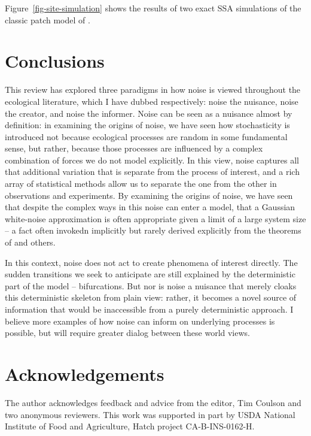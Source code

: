 \documentclass[
  authoryear,
  preprint,
  3p]{elsarticle}
\begin{document}
Figure~\ref{fig-site-simulation} shows the results of two exact SSA
simulations of the classic patch model of \citet{Levins1969}.

\section{Conclusions}\label{conclusions}

This review has explored three paradigms in how noise is viewed
throughout the ecological literature, which I have dubbed respectively:
noise the nuisance, noise the creator, and noise the informer. Noise can
be seen as a nuisance almost by definition: in examining the origins of
noise, we have seen how stochasticity is introduced not because
ecological processes are random in some fundamental sense, but rather,
because those processes are influenced by a complex combination of
forces we do not model explicitly. In this view, noise captures all that
additional variation that is separate from the process of interest, and
a rich array of statistical methods allow us to separate the one from
the other in observations and experiments. By examining the origins of
noise, we have seen that despite the complex ways in this noise can
enter a model, that a Gaussian white-noise approximation
\citep{vanKampen2007, Black2012} is often appropriate given a limit of a
large system size -- a fact often invokedn implicitly but rarely derived
explicitly from the theorems of \citet{Kurtz1978} and others.

In this context, noise does not act to create phenomena of interest
directly. The sudden transitions we seek to anticipate are still
explained by the deterministic part of the model -- bifurcations. But
nor is noise a nuisance that merely cloaks this deterministic skeleton
from plain view: rather, it becomes a novel source of information that
would be inaccessible from a purely deterministic approach. I believe
more examples of how noise can inform on underlying processes is
possible, but will require greater dialog between these world views.

\section{Acknowledgements}\label{acknowledgements}

The author acknowledges feedback and advice from the editor, Tim Coulson
and two anonymous reviewers. This work was supported in part by USDA
National Institute of Food and Agriculture, Hatch project
CA-B-INS-0162-H.


\renewcommand\refname{References}
  
\end{document}
